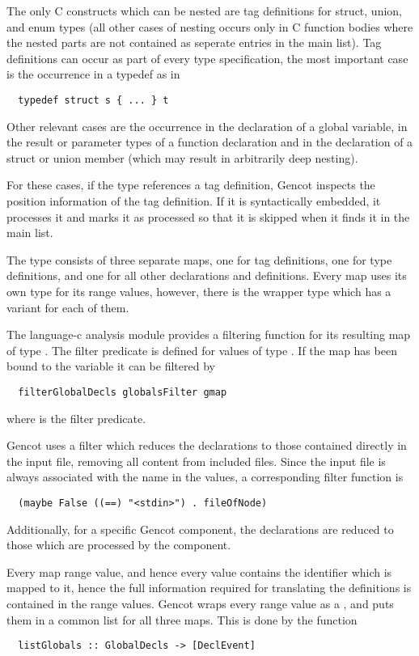 The only C constructs which can be nested are tag definitions for struct, union, and enum types (all other cases of nesting
occurs only in C function bodies where the nested parts are not contained as seperate entries in the main list). Tag definitions
can occur as part of every type specification, the most important case is the occurrence in a typedef as in
\begin{verbatim}
  typedef struct s { ... } t
\end{verbatim}
Other relevant cases are the occurrence in the declaration of a global variable, in the result or parameter types of a 
function declaration and in the declaration of a struct or union member (which may result in arbitrarily deep nesting).

For these cases, if the type references a tag definition, Gencot inspects the position information of the tag definition.
If it is syntactically embedded, it processes it and marks it as processed so that it is skipped when it finds it in the
main list.

The type  consists of three separate maps, one for tag definitions, one for type definitions,
and one for all other declarations and definitions. Every map uses its own type for its range values, however, 
there is the wrapper type  which has a variant for each of them. 

The language-c analysis module provides a filtering function for its resulting map of type . The filter 
predicate is defined for values of type . If the map has been bound to the variable 
it can be filtered by
\begin{verbatim}
  filterGlobalDecls globalsFilter gmap
\end{verbatim}
where  is the filter predicate.

Gencot uses a filter which reduces the declarations to those contained directly in the input file, removing all
content from included files. Since the input file is always associated with the name  in the 
values, a corresponding filter function is
\begin{verbatim}
  (maybe False ((==) "<stdin>") . fileOfNode)
\end{verbatim}
Additionally, for a specific Gencot component, the declarations are reduced to those which are processed by the component. 

Every map range value, and hence every  value contains the identifier which is mapped to it, 
hence the full information required for translating the definitions is contained in the range values. 
Gencot wraps every range value as a , and puts them in a common list for all three maps. This
is done by the function
\begin{verbatim}
  listGlobals :: GlobalDecls -> [DeclEvent]
\end{verbatim}

